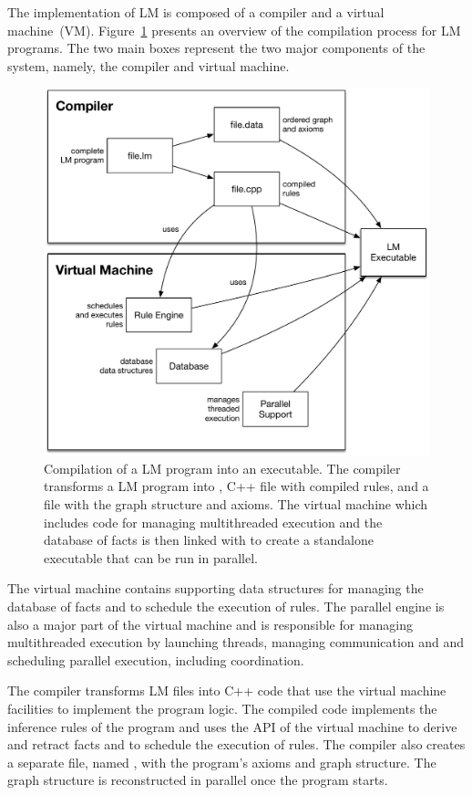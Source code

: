 The implementation of LM is composed of a compiler and a virtual machine~(VM).
Figure~\ref{fig:implementation:overview} presents an overview of the compilation
process for LM programs. The two main boxes represent the two major components
of the system, namely, the compiler and virtual machine.

\begin{figure}[ht]
  \centering
  \includegraphics[width=.75\linewidth]{figures/implementation/overview.pdf}
  \caption{Compilation of a LM program into an executable. The compiler
     transforms a LM program into , C++ file with compiled
     rules, and a  file with the graph structure and axioms. The virtual
     machine which includes code for managing multithreaded execution and the
     database of facts is then linked with  to create a
     standalone executable that can be run in parallel.}
  \label{fig:implementation:overview}
\end{figure}

The virtual machine contains supporting data structures for managing the
database of facts and to schedule the execution of rules. The parallel engine is
also a major part of the virtual machine and is responsible for managing
multithreaded execution by launching threads, managing communication and
and scheduling parallel execution, including coordination.

The compiler transforms LM files into C++ code that use the virtual machine
facilities to implement the program logic.  The compiled code implements the
inference rules of the program and uses the API of the virtual machine to derive
and retract facts and to schedule the execution of rules.  The compiler also
creates a separate file, named , with the program's axioms and
graph structure. The graph structure is reconstructed in parallel once the
program starts.

